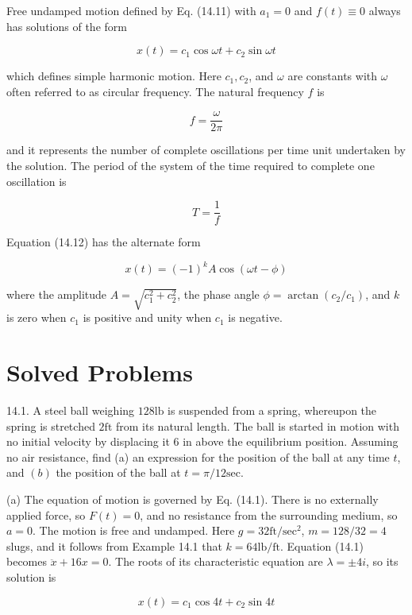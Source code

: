 \documentclass[10pt]{article}
\begin{document}
Free undamped motion defined by Eq. (14.11) with $a_{1}=0$ and $f(t) \equiv 0$ always has solutions of the form


\begin{equation*}
x(t)=c_{1} \cos \omega t+c_{2} \sin \omega t \tag{14.12}
\end{equation*}


which defines simple harmonic motion. Here $c_{1}, c_{2}$, and $\omega$ are constants with $\omega$ often referred to as circular frequency. The natural frequency $f$ is

$$
f=\frac{\omega}{2 \pi}
$$

and it represents the number of complete oscillations per time unit undertaken by the solution. The period of the system of the time required to complete one oscillation is

$$
T=\frac{1}{f}
$$

Equation (14.12) has the alternate form


\begin{equation*}
x(t)=(-1)^{k} A \cos (\omega t-\phi) \tag{14.13}
\end{equation*}


where the amplitude $A=\sqrt{c_{1}^{2}+c_{2}^{2}}$, the phase angle $\phi=\arctan \left(c_{2} / c_{1}\right)$, and $k$ is zero when $c_{1}$ is positive and unity when $c_{1}$ is negative.

\section*{Solved Problems}
14.1. A steel ball weighing $128 \mathrm{lb}$ is suspended from a spring, whereupon the spring is stretched $2 \mathrm{ft}$ from its natural length. The ball is started in motion with no initial velocity by displacing it 6 in above the equilibrium position. Assuming no air resistance, find (a) an expression for the position of the ball at any time $t$, and $(b)$ the position of the ball at $t=\pi / 12 \mathrm{sec}$.

(a) The equation of motion is governed by Eq. (14.1). There is no externally applied force, so $F(t)=0$, and no resistance from the surrounding medium, so $a=0$. The motion is free and undamped. Here $g=32 \mathrm{ft} / \mathrm{sec}^{2}$, $m=128 / 32=4$ slugs, and it follows from Example 14.1 that $k=64 \mathrm{lb} / \mathrm{ft}$. Equation (14.1) becomes $\ddot{x}+16 x=0$. The roots of its characteristic equation are $\lambda= \pm 4 i$, so its solution is


\begin{equation*}
x(t)=c_{1} \cos 4 t+c_{2} \sin 4 t \tag{1}
\end{equation*}
\end{document}

